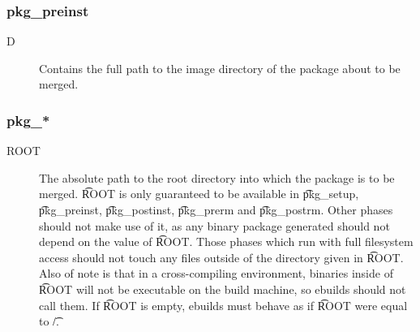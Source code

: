 \subsubsection{pkg\_preinst}
\begin{description}
\item[D] Contains the full path to the image directory of the package about to be merged.
\end{description}

\subsubsection{pkg\_*}
\begin{description}
\item[ROOT] The absolute path to the root directory into which the package is to be merged. \t{ROOT}
    is only guaranteed to be available in \t{pkg\_setup}, \t{pkg\_preinst}, \t{pkg\_postinst},
    \t{pkg\_prerm} and \t{pkg\_postrm}. Other phases should not make use of it, as any binary
    package generated should not depend on the value of \t{ROOT}. Those phases which run with full
    filesystem access should not touch any files outside of the directory given in \t{ROOT}. Also of
    note is that in a cross-compiling environment, binaries inside of \t{ROOT} will not be
    executable on the build machine, so ebuilds should not call them. If \t{ROOT} is empty, ebuilds
    must behave as if \t{ROOT} were equal to \t{/}.
\end{description}


